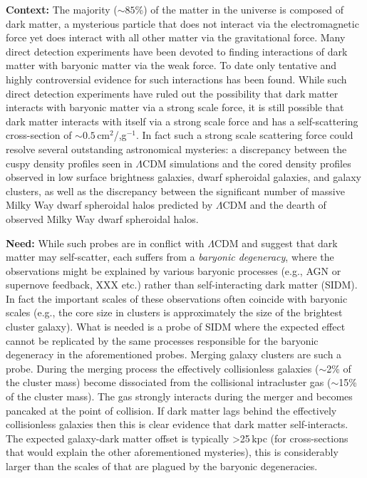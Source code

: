 
\noindent\textbf{Context:} 
The majority ($\sim85$\%) of the matter in the universe is composed of dark matter, a mysterious particle that does not interact via the electromagnetic force yet does interact with all other matter via the gravitational force.
Many direct detection experiments have been devoted to finding interactions of dark matter with baryonic matter via the weak force.
To date only tentative and highly controversial evidence for such interactions has been found.
While such direct detection experiments have ruled out the possibility that dark matter interacts with baryonic matter via a strong scale force, it is still possible that dark matter interacts with itself via a strong scale force and has a self-scattering cross-section of $\sim0.5$\,cm$^2$/,g$^{-1}$.
In fact such a strong scale scattering force could resolve several outstanding astronomical mysteries: a discrepancy between the cuspy density profiles seen in $\Lambda$CDM simulations and the cored density profiles observed in low surface brightness galaxies, dwarf spheroidal galaxies, and galaxy clusters, as well as the discrepancy between the significant number of massive Milky Way dwarf spheroidal halos predicted by $\Lambda$CDM and the dearth of observed Milky Way dwarf spheroidal halos.
 


\noindent\textbf{Need:} 
While such probes are in conflict with $\Lambda$CDM and suggest that dark matter may self-scatter, each suffers from a \emph{baryonic degeneracy}, where the observations might be explained by various baryonic processes (e.g., AGN or supernove feedback, XXX etc.) rather than self-interacting dark matter (SIDM).
In fact the important scales of these observations often coincide with baryonic scales (e.g., the core size in clusters is approximately the size of the brightest cluster galaxy).
What is needed is a probe of SIDM where the expected effect cannot be replicated by the same processes responsible for the baryonic degeneracy in the aforementioned probes.
Merging galaxy clusters are such a probe.
During the merging process the effectively collisionless galaxies ($\sim$2\% of the cluster mass) become dissociated from the collisional intracluster gas ($\sim$15\% of the cluster mass).
The gas strongly interacts during the merger and becomes pancaked at the point of collision.
If dark matter lags behind the effectively collisionless galaxies then this is clear evidence that dark matter self-interacts.
The expected galaxy-dark matter offset is typically >25\,kpc (for cross-sections that would explain the other aforementioned mysteries), this is considerably larger than the scales of that are plagued by the baryonic degeneracies.

